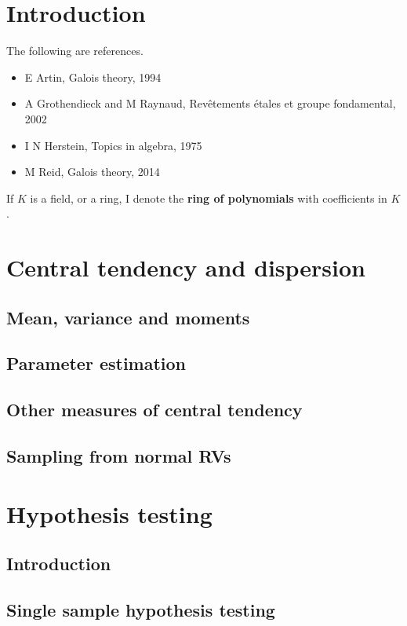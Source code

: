 \documentclass[../Year1/Year1.tex]{subfiles}
\begin{document}
\section{Introduction}


The following are references.
\begin{itemize}
\item E Artin, Galois theory, 1994
\item A Grothendieck and M Raynaud, Rev\^etements \'etales et groupe fondamental, 2002
\item I N Herstein, Topics in algebra, 1975
\item M Reid, Galois theory, 2014
\end{itemize}

\begin{notation*}
If $ K $ is a field, or a ring, I denote
the \textbf{ring of polynomials} with coefficients in $ K $.
\end{notation*}

\section{Central tendency and dispersion}
\subsection{Mean, variance and moments}
\subsection{Parameter estimation}
\subsection{Other measures of central tendency}
\subsection{Sampling from normal RVs}
\section{Hypothesis testing}
\subsection{Introduction}
\subsection{Single sample hypothesis testing}
\end{document}
